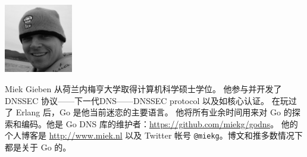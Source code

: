 \includegraphics[width=3cm]{fig/avatar-miekg-300x300}

Miek Gieben 从荷兰内梅亨大学取得计算机科学硕士学位。
他参与并开发了 DNSSEC 协议——下一代DNS——DNSSEC protocol \cite{RFC4033,RFC4034,RFC4035}以及如核心认证\cite{RFC4641}。
在玩过了 Erlang 后，Go 是他当前迷恋的主要语言。
他将所有业余时间用来对 Go 的探索和编码。他是 Go DNS 库的维护者：\url{https://github.com/miekg/godns}。
他的个人博客是 \url{http://www.miek.nl} 以及 Twitter 帐号 \texttt{@miekg}。博文和推多数情况下都是关于 Go 的。
